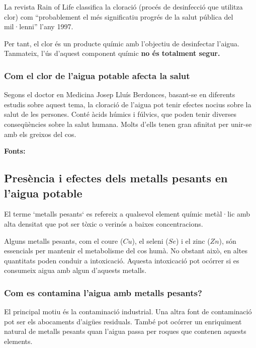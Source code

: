 La revista Rain of Life \cite{RoF} classifica la cloració (procés de desinfecció que utilitza clor) com “probablement el més significatiu progrés de la salut pública del mil·lenni” l'any 1997.

Per tant, el clor és un producte químic amb l'objectiu de desinfectar l'aigua. Tanmateix, l'ús d'aquest component químic \textbf{no és totalment segur.}

\subsubsection{Com el clor de l'aigua potable afecta la salut}
Segons el doctor en Medicina Josep Lluís Berdonces, basant-se en diferents estudis sobre aquest tema, la cloració de l’aigua pot tenir efectes nocius sobre la salut de les persones. Conté àcids húmics i fúlvics, que poden tenir diverses conseqüències sobre la salut humana. Molts d’ells tenen gran afinitat per unir-se amb els greixos del cos.

\textbf{Fonts:} \cite{RoF}

\subsection{Presència i efectes dels metalls pesants en l’aigua potable} \label{subsec:metallspesats}
El terme `metalls pesants` es refereix a qualsevol element químic metàl·lic amb alta densitat que pot ser tòxic o verinós a baixes concentracions.

Alguns metalls pesants, com el coure ($Cu$), el seleni ($Se$) i el zinc ($Zn$), són essencials per mantenir el metabolisme del cos humà. No obstant això, en altes quantitats poden conduir a intoxicació. Aquesta intoxicació pot ocórrer si es consumeix aigua amb algun d’aquests metalls.

\subsubsection{Com es contamina l’aigua amb metalls pesants?}
El principal motiu és la contaminació industrial. Una altra font de contaminació pot ser els abocaments d'aigües residuals. També pot ocórrer un enriquiment natural de metalls pesants quan l’aigua passa per roques que contenen aquests elements.

